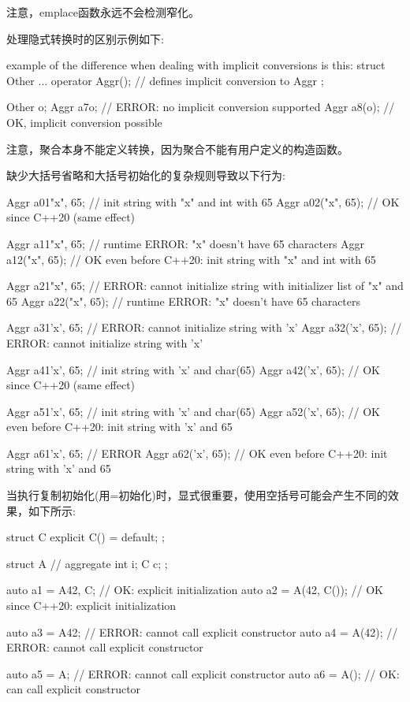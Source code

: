 注意，emplace函数永远不会检测窄化。

处理隐式转换时的区别示例如下:

\begin{cpp}
example of the difference when dealing with implicit conversions is this:
struct Other {
	...
	operator Aggr(); // defines implicit conversion to Aggr
};

Other o;
Aggr a7{o}; // ERROR: no implicit conversion supported
Aggr a8(o); // OK, implicit conversion possible
\end{cpp}

注意，聚合本身不能定义转换，因为聚合不能有用户定义的构造函数。

缺少大括号省略和大括号初始化的复杂规则导致以下行为:

\begin{cpp}
Aggr a01{"x", 65}; // init string with "x" and int with 65
Aggr a02("x", 65); // OK since C++20 (same effect)

Aggr a11{{"x", 65}}; // runtime ERROR: "x" doesn’t have 65 characters
Aggr a12({"x", 65}); // OK even before C++20: init string with "x" and int with 65

Aggr a21{{{"x", 65}}}; // ERROR: cannot initialize string with initializer list of "x" and 65
Aggr a22({{"x", 65}}); // runtime ERROR: "x" doesn’t have 65 characters

Aggr a31{'x', 65}; // ERROR: cannot initialize string with ’x’
Aggr a32('x', 65); // ERROR: cannot initialize string with ’x’

Aggr a41{{'x', 65}}; // init string with ’x’ and char(65)
Aggr a42({'x', 65}); // OK since C++20 (same effect)

Aggr a51{{{'x', 65}}}; // init string with ’x’ and char(65)
Aggr a52({{'x', 65}}); // OK even before C++20: init string with ’x’ and 65

Aggr a61{{{{'x', 65}}}}; // ERROR
Aggr a62({{{'x', 65}}}); // OK even before C++20: init string with ’x’ and 65
\end{cpp}

当执行复制初始化(用=初始化)时，显式很重要，使用空括号可能会产生不同的效果，如下所示:

\begin{cpp}
struct C {
	explicit C() = default;
};

struct A { // aggregate
	int i;
	C c;
};

auto a1 = A{42, C{}}; // OK: explicit initialization
auto a2 = A(42, C()); // OK since C++20: explicit initialization

auto a3 = A{42}; // ERROR: cannot call explicit constructor
auto a4 = A(42); // ERROR: cannot call explicit constructor

auto a5 = A{}; // ERROR: cannot call explicit constructor
auto a6 = A(); // OK: can call explicit constructor
\end{cpp}

